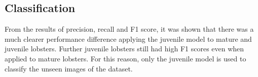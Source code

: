 \subsection{Classification}
From the results of precision, recall and F1 score, it was shown that there was a much clearer performance difference applying the juvenile model to mature and juvenile lobsters. Further juvenile lobsters still had high F1 scores even when applied to mature lobsters. For this reason, only the juvenile model is used to classify the unseen images of the dataset. 
